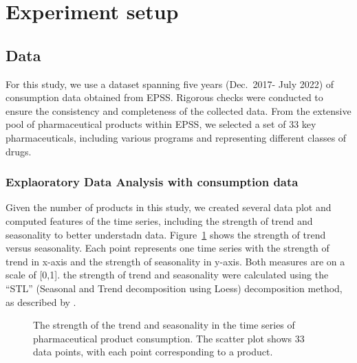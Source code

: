 \documentclass[
  authoryear,
  preprint,
  3p]{elsarticle}
\begin{document}
\section{Experiment setup}\label{sec-experiment}

\subsection{Data}\label{sec-data}

For this study, we use a dataset spanning five years (Dec.~2017- July
2022) of consumption data obtained from EPSS. Rigorous checks were
conducted to ensure the consistency and completeness of the collected
data. From the extensive pool of pharmaceutical products within EPSS, we
selected a set of 33 key pharmaceuticals, including various programs and
representing different classes of drugs.

\subsubsection{Explaoratory Data Analysis with consumption
data}\label{explaoratory-data-analysis-with-consumption-data}

Given the number of products in this study, we created several data plot
and computed features of the time series, including the strength of
trend and seasonality to better understadn data.
Figure~\ref{fig-feature} shows the strength of trend versus seasonality.
Each point represents one time series with the strength of trend in
x-axis and the strength of seasonality in y-axis. Both measures are on a
scale of {[}0,1{]}. the strength of trend and seasonality were
calculated using the ``STL'' (Seasonal and Trend decomposition using
Loess) decomposition method, as described by \citet{mstl}.

\begin{figure}


\caption{\label{fig-feature}The strength of the trend and seasonality in
the time series of pharmaceutical product consumption. The scatter plot
shows 33 data points, with each point corresponding to a product.}

\end{figure}%
\end{document}
